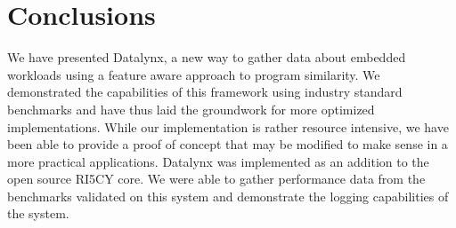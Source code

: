 \documentclass[../bachelor_paper.tex]{subfiles}
\begin{document}
\chapter{Conclusions}
    \label{ch:conc}
    
We have presented Datalynx, a new way to gather data about embedded workloads using a feature aware approach to program similarity. We demonstrated the capabilities of this framework using industry standard benchmarks and have thus laid the groundwork for more optimized implementations. While our implementation is rather resource intensive, we have been able to provide a proof of concept that may be modified to make sense in a more practical applications. Datalynx was implemented as an addition to the open source RI5CY core. We were able to gather performance data from the benchmarks validated on this system and demonstrate the logging capabilities of the system.

\isstandalone



\fi
\end{document}
